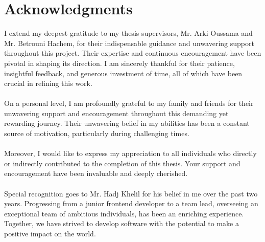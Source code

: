 \chapter*{Acknowledgments}

I extend my deepest gratitude to my thesis supervisors, Mr. Arki Oussama and Mr. Betrouni Hachem, for their indispensable guidance and unwavering support throughout this project. Their expertise and continuous encouragement have been pivotal in shaping its direction. I am sincerely thankful for their patience, insightful feedback, and generous investment of time, all of which have been crucial in refining this work.
\\
\\
On a personal level, I am profoundly grateful to my family and friends for their unwavering support and encouragement throughout this demanding yet rewarding journey. Their unwavering belief in my abilities has been a constant source of motivation, particularly during challenging times.
\\
\\
Moreover, I would like to express my appreciation to all individuals who directly or indirectly contributed to the completion of this thesis. Your support and encouragement have been invaluable and deeply cherished.
\\
\\
Special recognition goes to Mr. Hadj Khelil for his belief in me over the past two years. Progressing from a junior frontend developer to a team lead, overseeing an exceptional team of ambitious individuals, has been an enriching experience. Together, we have strived to develop software with the potential to make a positive impact on the world.